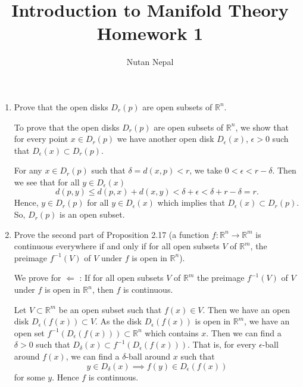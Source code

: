 \documentclass[12pt]{article}
\title{Introduction to Manifold Theory \\
\large Homework 1
}
\author{Nutan Nepal}
\newcommand{\rl}{\mathbb{R}}
\begin{document}
\maketitle
 \underline{}\hrulefill
\vspace{.1in}

\begin{enumerate}

\item Prove that the open disks $D_r(p)$ are 
open subsets of $\rl^n$.

\begin{mybox}

  To prove that the open disks $D_r(p)$
  are open subsets of $\rl^n$, we show that
  for every point $x\in D_r(p)$ we have another
  open disk $D_{\epsilon}(x)$, $\epsilon>0$ such that
  $D_{\epsilon}(x)\subset D_r(p)$.

  \setlength{\parskip}{3mm}
  For any $x\in D_r(p)$ such that $\delta=d(x,p)<r$,
  we take $0<\epsilon<r-\delta$. Then we see that
  for all $y\in D_{\epsilon}(x)$
  $$d(p,y)\leq d(p,x)+d(x,y)<\delta+\epsilon<
  \delta+r-\delta=r.$$
  Hence, $y\in D_r(p)$ for all $y\in D_{\epsilon}(x)$
  which implies that $D_{\epsilon}(x)\subset D_r(p)$.
  So, $D_r(p)$ is an open subset.
\end{mybox}


\item Prove the second part of Proposition 2.17
 (a function $f : \rl^n\to \rl^m$ is continuous
 everywhere if and only if for all open subsets
 $V$ of $\rl^m$, the preimage $f^{-1}(V)$ of $V$
 under $f$ is open in $\rl^n$).
 
\begin{mybox}

  We prove for $\Leftarrow$ : If for all open subsets
  $V$ of $\rl^m$ the preimage $f^{-1}(V)$ of $V$
  under $f$ is open in $\rl^n$, then $f$ is continuous.

  \setlength{\parskip}{3mm}
  Let $V\subset \rl^m$ be an open subset such that
  $f(x)\in V$. Then we have an open disk
  $D_{\epsilon}(f(x)) \subset V$.
  As the disk $D_{\epsilon}(f(x))$ is open
  in $\rl^m$, we have an open set
  $f^{-1}(D_{\epsilon}(f(x)))
  \subset \rl^n$ which contains $x$. Then we can find
  a $\delta>0$ such that
  $D_{\delta}(x)\subset f^{-1}(D_{\epsilon}(f(x)))$.
  That is, for every $\epsilon$-ball around $f(x)$,
  we can find a $\delta$-ball around $x$ such that
  $$y\in D_{\delta}(x)\implies f(y)\in D_{\epsilon}(f(x))$$
  for some $y$. Hence $f$ is continuous.
\end{mybox}
  

\end{enumerate}
\end{document}

